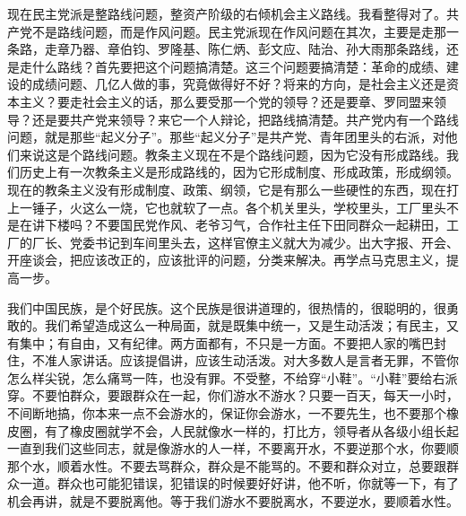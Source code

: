 现在民主党派是整路线问题，整资产阶级的右倾机会主义路线。我看整得对了。共产党不是路线问题，而是作风问题。民主党派现在作风问题在其次，主要是走那一条路，走章乃器、章伯钧、罗隆基、陈仁炳、彭文应、陆治、孙大雨那条路线，还是走什么路线？首先要把这个问题搞清楚。这三个问题要搞清楚：革命的成绩、建设的成绩问题、几亿人做的事，究竟做得好不好？将来的方向，是社会主义还是资本主义？要走社会主义的话，那么要受那一个党的领导？还是要章、罗同盟来领导？还是要共产党来领导？来它一个人辩论，把路线搞清楚。共产党内有一个路线问题，就是那些“起义分子”。那些“起义分子”是共产党、青年团里头的右派，对他们来说这是个路线问题。教条主义现在不是个路线问题，因为它没有形成路线。我们历史上有一次教条主义是形成路线的，因为它形成制度、形成政策，形成纲领。现在的教条主义没有形成制度、政策、纲领，它是有那么一些硬性的东西，现在打上一锤子，火这么一烧，它也就软了一点。各个机关里头，学校里头，工厂里头不是在讲下楼吗？不要国民党作风、老爷习气，合作社主任下田同群众一起耕田，工厂的厂长、党委书记到车间里头去，这样官僚主义就大为减少。出大字报、开会、开座谈会，把应该改正的，应该批评的问题，分类来解决。再学点马克思主义，提高一步。

我们中国民族，是个好民族。这个民族是很讲道理的，很热情的，很聪明的，很勇敢的。我们希望造成这么一种局面，就是既集中统一，又是生动活泼；有民主，又有集中；有自由，又有纪律。两方面都有，不只是一方面。不要把人家的嘴巴封住，不准人家讲话。应该提倡讲，应该生动活泼。对大多数人是言者无罪，不管你怎么样尖锐，怎么痛骂一阵，也没有罪。不受整，不给穿“小鞋”。“小鞋”要给右派穿。不要怕群众，要跟群众在一起，你们游水不游水？只要一百天，每天一小时，不间断地搞，你本来一点不会游水的，保证你会游水，一不要先生，也不要那个橡皮圈，有了橡皮圈就学不会，人民就像水一样的，打比方，领导者从各级小组长起一直到我们这些同志，就是像游水的人一样，不要离开水，不要逆那个水，你要顺那个水，顺着水性。不要去骂群众，群众是不能骂的。不要和群众对立，总要跟群众一道。群众也可能犯错误，犯错误的时候要好好讲，他不听，你就等一下，有了机会再讲，就是不要脱离他。等于我们游水不要脱离水，不要逆水，要顺着水性。

